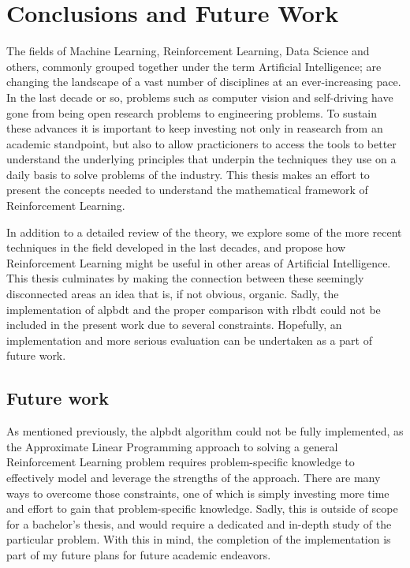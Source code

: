 \chapter{Conclusions and Future Work}
\label{chapter:Conclusions}

The fields of Machine Learning, Reinforcement Learning, Data Science and others,
commonly grouped together under the term Artificial Intelligence; are changing
the landscape of a vast number of disciplines at an ever-increasing pace. In the
last decade or so, problems such as computer vision and self-driving have gone
from being open research problems to engineering problems. To sustain these
advances it is important to keep investing not only in reasearch from an
academic standpoint, but also to allow practicioners to access the tools to
better understand the underlying principles that underpin the techniques they
use on a daily basis to solve problems of the industry. This thesis makes an
effort to present the concepts needed to understand the mathematical framework
of Reinforcement Learning.

In addition to a detailed review of the theory, we explore some of the more
recent techniques in the field developed in the last decades, and propose how
Reinforcement Learning might be useful in other areas of Artificial
Intelligence. This thesis culminates by making the connection between these
seemingly disconnected areas an idea that is, if not obvious, organic. Sadly,
the implementation of \acf{alpbdt} and the proper comparison with \acf{rlbdt}
could not be included in the present work due to several constraints. Hopefully,
an implementation and more serious evaluation can be undertaken as a part of
future work.

\section{Future work}
As mentioned previously, the \ac{alpbdt} algorithm could not be fully
implemented, as the Approximate Linear Programming approach to solving a general
Reinforcement Learning problem requires problem-specific knowledge to
effectively model and leverage the strengths of the approach. There are many
ways to overcome those constraints, one of which is simply investing more time
and effort to gain that problem-specific knowledge. Sadly, this is outside of
scope for a bachelor's thesis, and would require a dedicated and in-depth study
of the particular problem. With this in mind, the completion of the
implementation is part of my future plans for future academic endeavors.

